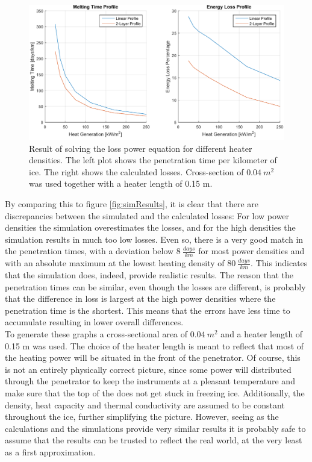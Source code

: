 \begin{figure}[ht]
	\centering
	\includegraphics[width=.9\textwidth]{figures/LAMC/verificationResult.pdf}
	\caption{Result of solving the loss power equation for different heater densities. The left plot shows the penetration time per kilometer of ice. The right shows the calculated losses. Cross-section of $\SI{0.04}{m^2}$ was used together with a heater length of 0.15 m.}
	\label{fig:verificationResult}
\end{figure}

\noindent
By comparing this to figure \ref{fig:simResults}, it is clear that there are discrepancies between the simulated and the calculated losses: For low power densities the simulation overestimates the losses, and for the high densities the simulation results in much too low losses. Even so, there is a very good match in the penetration times, with a deviation below $\SI{8}{\frac{days}{km}}$ for most power densities and with an absolute maximum at the lowest heating density of  $\SI{80}{\frac{days}{km}}$. This indicates that the simulation does, indeed, provide realistic results. The reason that the penetration times can be similar, even though the losses are different, is probably that the difference in loss is largest at the high power densities where the penetration time is the shortest. This means that the errors have less time to accumulate resulting in lower overall differences.\\

\noindent
To generate these graphs a cross-sectional area of $\SI{0.04}{m^2}$ and a heater length of 0.15 m was used. The choice of the heater length is meant to reflect that most of the heating power will be situated in the front of the penetrator. Of course, this is not an entirely physically correct picture, since some power will distributed through the penetrator to keep the instruments at a pleasant temperature and make sure that the top of the does not get stuck in freezing ice. Additionally, the density, heat capacity and thermal conductivity are assumed to be constant throughout the ice, further simplifying the picture. However, seeing as the calculations and the simulations provide very similar results it is probably safe to assume that the results can be trusted to reflect the real world, at the very least as a first approximation.\\

